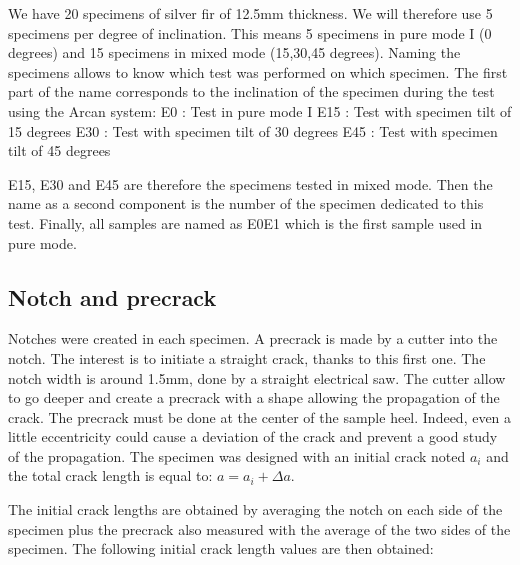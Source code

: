 We have 20 specimens of silver fir of 12.5mm thickness.
We will therefore use 5 specimens per degree of inclination. This means 5 specimens in pure mode I (0 degrees) and 15 specimens in mixed mode (15,30,45 degrees).
Naming the specimens allows to know which test was performed on which specimen. The first part of the name corresponds to the inclination of the specimen during the test using the Arcan system:
\newline
E0 : Test in pure mode I
\newline
E15 : Test with specimen tilt of 15 degrees
\newline
E30 : Test with specimen tilt of 30 degrees
\newline
E45 : Test with specimen tilt of 45 degrees


E15, E30 and E45 are therefore the specimens tested in mixed mode.
Then the name as a second component is the number of the specimen dedicated to this test.
Finally, all samples are named as E0E1 which is the first sample used in pure mode.

\subsection{Notch and precrack}

Notches were created in each specimen. A precrack is made by a cutter into the notch. The interest is to initiate a straight crack, thanks to this first one. The notch width is around 1.5mm, done by a straight electrical saw. The cutter allow to go deeper and create a precrack with a shape allowing the propagation of the crack. The precrack must be done at the center of the sample heel. Indeed, even a little eccentricity could cause a deviation of the crack and prevent a good study of the propagation. The specimen was designed with an initial crack noted $a_i$ and the total crack length is equal to: $a=a_i+\Delta a$.

The initial crack lengths are obtained by averaging the notch on each side of the specimen plus the precrack also measured with the average of the two sides of the specimen.
The following initial crack length values are then obtained:

